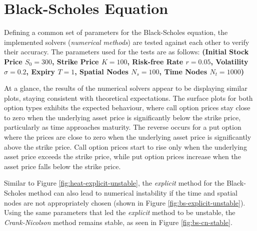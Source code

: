 \section{Black-Scholes Equation}\label{sec:bs_equation-results}
Defining a common set of parameters for the Black-Scholes equation, the implemented solvers (\textit{numerical methods}) are tested against each other to verify their accuracy. The parameters used for the tests are as follows:
\textbf{(Initial Stock Price $S_0 = 300$, Strike Price $K = 100$, Risk-free Rate $r = 0.05$, Volatility $\sigma = 0.2$, Expiry $T = 1$, Spatial Nodes $N_s = 100$, Time Nodes  $N_t = 1000$)}

At a glance, the results of the numerical solvers appear to be displaying similar plots, staying consistent with theoretical expectations. The surface plots for both option types exhibits the expected behaviour, where call option prices stay close to zero when the underlying asset price is significantly below the strike price, particularly as time approaches maturity. The reverse occurs for a put option where the prices are close to zero when the underlying asset price is significantly above the strike price. Call option prices start to rise only when the underlying asset price exceeds the strike price, while put option prices increase when the asset price falls below the strike price.

Similar to Figure \ref{fig:heat-explicit-unstable}, the \textit{explicit} method for the Black-Scholes method can also lead to numerical instability if the time and spatial nodes are not appropriately chosen (shown in Figure \ref{fig:bs-explicit-unstable}). Using the same parameters that led the \textit{explicit} method to be unstable, the \textit{Crank-Nicolson} method remains stable, as seen in Figure \ref{fig:bs-cn-stable}.

